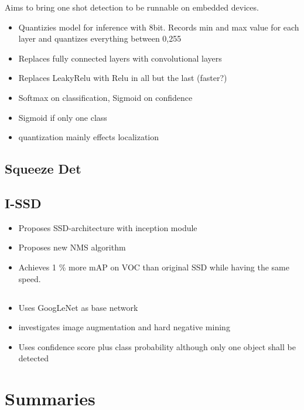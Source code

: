 	Aims to bring one shot detection to be runnable on embedded devices.
	
	\begin{itemize}
		\item Quantizies model for inference with 8bit. Records min and max value for each layer and quantizes everything between 0,255
		\item Replaces fully connected layers with convolutional layers
		\item Replaces LeakyRelu with Relu in all but the last (faster?)
		\item Softmax on classification, Sigmoid on confidence
		\item Sigmoid if only one class
		\item quantization mainly effects localization
	\end{itemize}
	
	\subsection{Squeeze Det \cite{Wu}}
	
	\subsection{I-SSD \cite{ChengchengNing2017}}

	\begin{itemize}
		\item Proposes SSD-architecture with inception module
		\item Proposes new NMS algorithm
		\item Achieves 1 \% more mAP on VOC than original SSD while having the same speed.
	\end{itemize}
	
	\subsection{\cite{Linb}}
	
	\begin{itemize}
		\item Uses GoogLeNet as base network
		\item investigates image augmentation and hard negative mining
		\item Uses confidence score plus class probability although only one object shall be detected
	\end{itemize}
		
	\section{Summaries}
